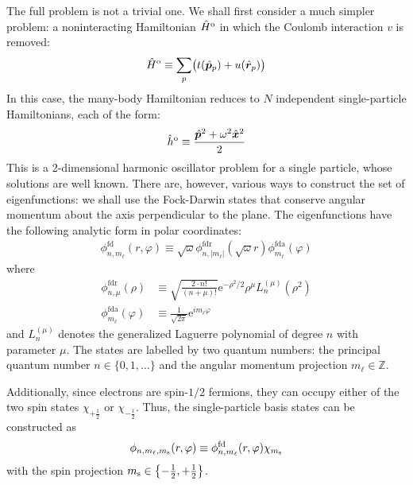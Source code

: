 \documentclass[amsmath, amssymb, aps, floatfix, nofootinbib, preprintnumbers,showpacs, superscriptaddress, twocolumn]{revtex4-1}
\begin{document}
The full problem is not a trivial one.  We shall first consider a much simpler
problem: a noninteracting Hamiltonian $\hat H^{\text o}$ in which the Coulomb
interaction $v$ is removed:
\begin{align*}
  \hat H^{\text o} \equiv \sum_{p} \bigl(
  t(\hat{\bm p}_p) + u(\hat{\bm r}_p)
  \bigr)
\end{align*}
In this case, the many-body Hamiltonian reduces to $N$ independent
single-particle Hamiltonians, each of the form:
\begin{align*}
  \hat h^{\text o} \equiv
  \frac{\hat{\bm p}^2 + \omega^2 \hat{\bm x}^2}{2}
\end{align*}
This is a 2-dimensional harmonic oscillator problem for a single particle,
whose solutions are well known.  There are, however, various ways to construct
the set of eigenfunctions: we shall use the Fock-Darwin states that conserve
angular momentum about the axis perpendicular to the plane.  The
eigenfunctions have the following analytic form in polar
coordinates:\citep[Appx.\ A]{lohne2010coupled}
\begin{gather*}
  \phi^{\text{fd}}_{n, m_\ell}(r, \varphi)
  \equiv \sqrt\omega
  \phi^{\text{fdr}}_{n, |m_\ell|}(\sqrt \omega r)
  \phi^{\text{fda}}_{m_\ell}(\varphi)
\end{gather*}
where
\begin{align*}
  \phi^{\text{fdr}}_{n, \mu}(\rho) &\equiv
  \sqrt{\frac{2 \cdot n!}{(n + \mu)!}}
  {\mathrm e}^{- \rho^2 / 2} \rho^\mu L_n^{(\mu)}(\rho^2) \\
  \phi^{\text{fda}}_{m_\ell}(\varphi) &\equiv
  \frac{1}{\sqrt{2 \pi}} {\mathrm e}^{i m_\ell \varphi}
\end{align*}
and $L_n^{(\mu)}$ denotes the generalized Laguerre polynomial of degree $n$
with parameter $\mu$.  The states are labelled by two quantum numbers: the
principal quantum number $n \in \{0, 1, \ldots\}$ and the angular momentum
projection $m_\ell \in \mathbb Z$.

Additionally, since electrons are spin-$1/2$ fermions, they can occupy either
of the two spin states $\chi_{+\frac12}$ or $\chi_{-\frac12}$.  Thus, the
single-particle basis states can be constructed as
\begin{align} \label{eq:singleparticlestate}
  \phi_{n, m_\ell, m_{\text s}}(r, \varphi) \equiv
  \phi^{\text{fd}}_{n, m_\ell}(r, \varphi) \chi_{m_{\text s}}
\end{align}
with the spin projection $m_{\text s} \in \bigl\{-\frac12, +\frac12\bigr\}$.
\end{document}
